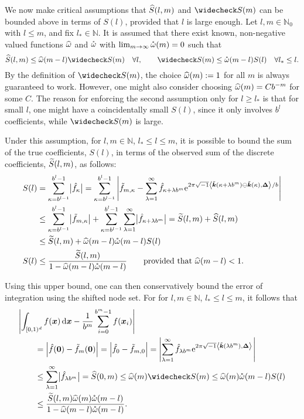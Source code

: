 \documentclass[graybox,footinfo]{svmult}
\newcommand{\N}{\mathbb{N}} %
\newcommand{\bszero}{\boldsymbol{0}} %
\newcommand{\bsx}{\boldsymbol{x}}    %
\newcommand{\bsDelta}{\boldsymbol{\Delta}}    %
\begin{document}
We now make critical assumptions that $\widehat{S}(l,m)$ and $\wcS(m)$ can be bounded above in terms of $S(l)$, provided that $l$ is large enough.  Let $l,m \in \N_0$ with $l \le m$, and fix $l_* \in \N$.  It is assumed that there exist known,  non-negative valued functions $\widehat{\omega}$ and $\mathring{\omega}$ with $\lim_{m \to \infty} \mathring{\omega}(m) = 0$ such that
\begin{equation} \label{conecond}
\hS(l,m) \le \homega(m-l) \wcS(m) \quad \forall l, \qquad
\wcS(m) \le \wcomega(m-l) S(l) \quad \forall l_* \le l.
\end{equation}
By the definition of $\wcS(m)$, the choice $\widehat{\omega}(m):=1$ for all $m$ is always guaranteed to work.  However, one might also consider choosing $\widehat{\omega}(m)=C b^{-m}$ for some $C$.  The reason for enforcing the second assumption only  for $l \ge l_*$ is that for small $l$, one might have a coincidentally small $S(l)$, since it only involves $b^l$ coefficients, while $\wcS(m)$ is large.

Under this assumption, for $l, m \in \N$, $l_* \le l \le m$, it is possible to bound the sum of the true coefficients, $S(l)$, in terms of the observed sum of the discrete coefficients, $\widetilde{S}(l,m)$, as follows:
\begin{align*}
S(l) &= \sum_{\kappa=b^{l-1}}^{b^{l}-1} \bigl \lvert \hf_{\kappa}\bigr\rvert= \sum_{\kappa=b^{l-1}}^{b^{l}-1} \abs{\tf_{m,\kappa} - \sum_{\lambda=1}^{\infty} \hf_{\kappa+\lambda b^{m}} \me^{2 \pi \sqrt{-1} \ip{\tvk(\kappa+\lambda b^{m}) \ominus \tvk(\kappa)}{\bsDelta}/b}}\\
&\le \sum_{\kappa=b^{l-1}}^{b^{l}-1} \bigl \lvert \tf_{m,\kappa} \bigr\rvert + \sum_{\kappa=b^{l-1}}^{b^{l}-1} \sum_{\lambda=1}^{\infty} \bigl \lvert \hf_{\kappa+\lambda b^{m}}\bigr\rvert = \tS(l,m) + \hS(l,m) \\
&\le \tS(l,m) + \homega(m-l) \wcomega(m-l) S(l) \\
S(l) & \le \frac{\tS(l,m)}{1 - \homega(m-l) \wcomega(m-l)} \qquad \text{provided that } \homega(m-l) < 1.
\end{align*}

Using this upper bound, one can then conservatively bound the error of integration using the shifted node set.  For for $l, m \in \N$, $l_* \le l \le m$, it follows that
\begin{align*}
\MoveEqLeft{\abs{\int_{\cube} f(\bsx) \, \dif \bsx - \frac{1}{b^m} \sum_{i=0}^{b^m-1} f(\bsx_i) }}\\
&= \abs{\hf(\bszero) - \tf_m(\bszero)} = \abs{\hf_0 - \tf_{m,0}} = \abs{\sum_{\lambda=1}^{\infty} \hf_{\lambda b^{m}} \me^{2 \pi \sqrt{-1}\ip{\tvk(\lambda b^{m})}{\bsDelta}}}\\
&\le \sum_{\lambda=1}^{\infty} \bigabs{\hf_{\lambda b^{m}}}
= \hS(0,m) \le \homega(m) \wcS(m) \le \homega(m) \wcomega(m-l) S(l) \\
& \le \frac{\tS(l,m)\homega(m) \wcomega(m-l)}{1 - \homega(m-l) \wcomega(m-l)}.
\end{align*}
\end{document}
